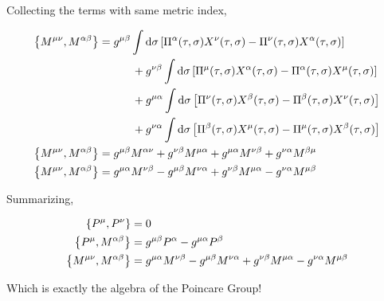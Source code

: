 Collecting the terms with same metric index,

\begin{align*}
    \acomm{M^{\mu\nu}}{M^{\alpha\beta}}&=g^{\mu\beta}\int\dd{\sigma}\qty[\Pi^\alpha\qty(\tau,\sigma)X^\nu\qty(\tau,\sigma)-\Pi^\nu\qty(\tau,\sigma)X^\alpha\qty(\tau,\sigma)]\\
    &\quad\quad\quad+g^{\nu\beta}\int\dd{\sigma}\qty[\Pi^\mu\qty(\tau,\sigma)X^\alpha\qty(\tau,\sigma)-\Pi^\alpha\qty(\tau,\sigma)X^\mu\qty(\tau,\sigma)]\\
    &\quad\quad\quad+g^{\mu\alpha}\int\dd{\sigma}\qty[\Pi^\nu\qty(\tau,\sigma)X^\beta\qty(\tau,\sigma)-\Pi^\beta\qty(\tau,\sigma)X^\nu\qty(\tau,\sigma)]\\
    &\quad\quad\quad+g^{\nu\alpha}\int\dd{\sigma}\qty[\Pi^\beta\qty(\tau,\sigma)X^\mu\qty(\tau,\sigma)-\Pi^\mu\qty(\tau,\sigma)X^\beta\qty(\tau,\sigma)]\\
    \acomm{M^{\mu\nu}}{M^{\alpha\beta}}&=g^{\mu\beta}M^{\alpha\nu}+g^{\nu\beta}M^{\mu\alpha}+g^{\mu\alpha}M^{\nu\beta}+g^{\nu\alpha}M^{\beta\mu}\\
    \acomm{M^{\mu\nu}}{M^{\alpha\beta}}&=g^{\mu\alpha}M^{\nu\beta}-g^{\mu\beta}M^{\nu\alpha}+g^{\nu\beta}M^{\mu\alpha}-g^{\nu\alpha}M^{\mu\beta}
\end{align*}

Summarizing,

\begin{align*}
    \acomm{P^\mu}{P^\nu}&=0\\
    \acomm{P^\mu}{M^{\alpha\beta}}&=g^{\mu\beta}P^\alpha -g^{\mu\alpha}P^\beta\\
    \acomm{M^{\mu\nu}}{M^{\alpha\beta}}&=g^{\mu\alpha}M^{\nu\beta}-g^{\mu\beta}M^{\nu\alpha}+g^{\nu\beta}M^{\mu\alpha}-g^{\nu\alpha}M^{\mu\beta}
\end{align*}

Which is exactly the algebra of the Poincare Group!